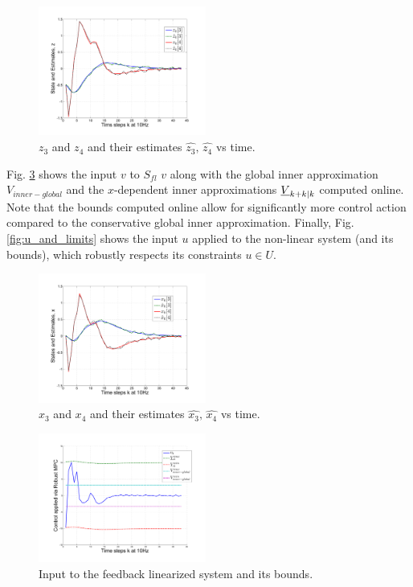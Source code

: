 \begin{figure}
\includegraphics[width=0.49\textwidth]{figs/z_3n4_manip.pdf}
\caption{$z_3$ and $z_4$ and their estimates $\hat{z_3}, \, \hat{z_4}$ vs time. }
\label{fig:z_34}
\end{figure}

Fig. \ref{fig:v_and_limits} shows the input $v$ to $S_{fl}$ $v$ along with the global inner approximation $V_{inner-global}$ and the $x$-dependent inner approximations $\underline{V}_{k+k|k}$ computed online.
Note that the bounds computed online allow for significantly more control action compared to the conservative global inner approximation. 
Finally, Fig. \ref{fig:u_and_limits} shows the input $u$ applied to the non-linear system (and its bounds), which robustly respects its constraints $u \in U$.

\begin{figure}
\includegraphics[width=0.49\textwidth]{figs/x_3n4_manip.pdf}
\caption{$x_3$ and $x_4$ and their estimates $\hat{x_3}, \, \hat{x_4}$ vs time. }
\label{fig:x_34}
\end{figure}

\begin{figure}
\includegraphics[width=0.49\textwidth]{figs/v_and_limits_manip.pdf}
\caption{Input to the feedback linearized system and its bounds.}
\label{fig:v_and_limits}
\end{figure}

